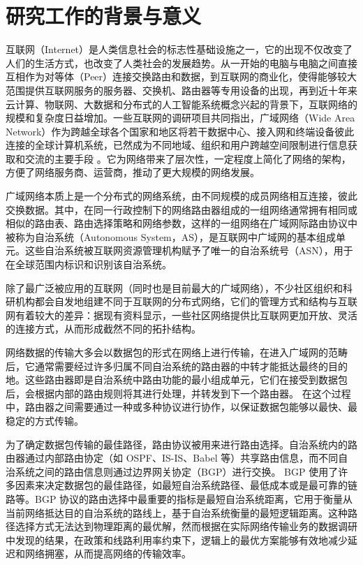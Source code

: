 \section{研究工作的背景与意义}


互联网（Internet）是人类信息社会的标志性基础设施之一，它的出现不仅改变了人们的生活方式，也改变了人类社会的发展趋势。从一开始的电脑与电脑之间直接互相作为对等体（Peer）连接交换路由和数据，到互联网的商业化，使得能够较大范围提供互联网服务的服务器、交换机、路由器等专用设备的出现，再到近十年来云计算、物联网、大数据和分布式的人工智能系统概念兴起的背景下，互联网络的规模和复杂度日益增加。一些互联网的调研项目共同指出，广域网络（Wide Area Network）作为跨越全球各个国家和地区将若干数据中心、接入网和终端设备彼此连接的全球计算机系统，已然成为不同地域、组织和用户跨越空间限制进行信息获取和交流的主要手段 。它为网络带来了层次性，一定程度上简化了网络的架构，方便了网络服务商、运营商，推动了更大规模的网络发展。

广域网络本质上是一个分布式的网络系统，由不同规模的成员网络相互连接，彼此交换数据。其中，在同一行政控制下的网络路由器组成的一组网络通常拥有相同或相似的路由表、路由选择策略和网络参数，这样的一组网络在广域网际路由协议中被称为自治系统（Autonomous System，AS），是互联网中广域网的基本组成单元。这些自治系统被互联网资源管理机构赋予了唯一的自治系统号（ASN），用于在全球范围内标识和识别该自治系统。

除了最广泛被应用的互联网（同时也是目前最大的广域网络），不少社区组织和科研机构都会自发地组建不同于互联网的分布式网络，它们的管理方式和结构与互联网有着较大的差异：据现有资料显示，一些社区网络提供比互联网更加开放、灵活的连接方式，从而形成截然不同的拓扑结构。

网络数据的传输大多会以数据包的形式在网络上进行传输，在进入广域网的范畴后，它通常需要经过许多归属不同自治系统的路由器的中转才能抵达最终的目的地。这些路由器即是自治系统中路由功能的最小组成单元，它们在接受到数据包后，会根据内部的路由规则将其进行处理，并转发到下一个路由器。 在这个过程中，路由器之间需要通过一种或多种协议进行协作，以保证数据包能够以最快、最稳定的方式传输。

为了确定数据包传输的最佳路径，路由协议被用来进行路由选择。自治系统内的路由器通过内部路由协定（如 OSPF、IS-IS、Babel 等）共享路由信息，而不同自治系统之间的路由信息则通过边界网关协定（BGP）进行交换。 BGP 使用了许多因素来决定数据包的最佳路径，如最短自治系统路径、最低成本或是最可靠的链路等。BGP 协议的路由选择中最重要的指标是最短自治系统距离，它用于衡量从当前网络抵达目的自治系统的路线上，基于自治系统衡量的最短逻辑距离。这种路径选择方式无法达到物理距离的最优解，然而根据在实际网络传输业务的数据调研中发现的结果，在政策和线路利用率约束下，逻辑上的最优方案能够有效地减少延迟和网络拥塞，从而提高网络的传输效率。


